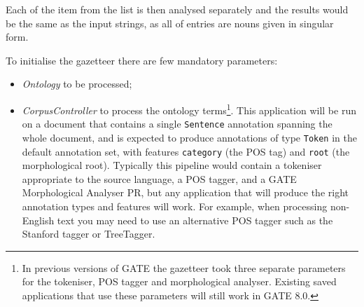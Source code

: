 Each of the item from the list is then analysed separately and the results
would be the same as the input strings, as all of entries are nouns given in
singular form.


To initialise the gazetteer there are few mandatory parameters:
\begin{itemize}
\item \emph{Ontology} to be processed;
\item \emph{CorpusController} to process the ontology terms\footnote{In
  previous versions of GATE the gazetteer took three separate parameters for
  the tokeniser, POS tagger and morphological analyser.  Existing saved
  applications that use these parameters will still work in GATE 8.0.}.  This
  application will be run on a document that contains a single \verb!Sentence!
  annotation spanning the whole document, and is expected to produce
  annotations of type \verb!Token! in the default annotation set, with features
  \verb!category!  (the POS tag) and \verb!root! (the morphological root).
  Typically this pipeline would contain a tokeniser appropriate to the source
  language, a POS tagger, and a GATE Morphological Analyser PR, but any
  application that will produce the right annotation types and features will
  work.  For example, when processing non-English text you may need to use an
  alternative POS tagger such as the Stanford tagger or TreeTagger.
\end{itemize}

